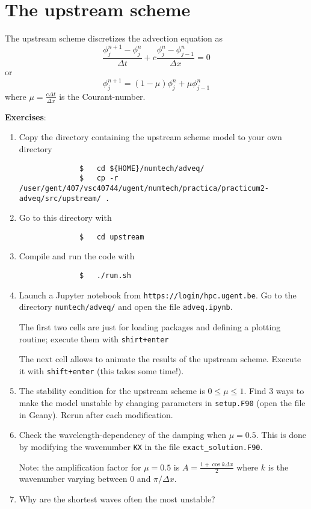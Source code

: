 \documentclass[a4paper]{article}
\begin{document}
\section{The upstream scheme}
%
\par
The upstream scheme discretizes the advection equation as
%
\begin{equation*}
	\frac{\phi^{n+1}_{j}-\phi^{n}_{j}}{\Delta t}+c\frac{\phi^{n}_{j}-\phi^{n}_{j-1}}{\Delta x}=0
\end{equation*}
%
or
%
\begin{equation*}
	\phi^{n+1}_{j}=(1-\mu)\phi^{n}_{j}+\mu\phi^{n}_{j-1}
\end{equation*}
%
where $\mu=\frac{c\Delta t}{\Delta x}$ is the Courant-number.
%
\par\vspace*{3ex}\clearpage
\textbf{Exercises}:
%
\begin{enumerate}
	\item Copy the directory containing the upstream scheme model to your own directory
		\begin{verbatim}
			  $   cd ${HOME}/numtech/adveq/
			  $   cp -r /user/gent/407/vsc40744/ugent/numtech/practica/practicum2-adveq/src/upstream/ .
		\end{verbatim}
	\item Go to this directory with
		\begin{verbatim}
			  $   cd upstream
		\end{verbatim}
	\item Compile and run the code with
		\begin{verbatim}
			  $   ./run.sh
		\end{verbatim}
	\item Launch a Jupyter notebook from \texttt{https://login/hpc.ugent.be}. Go to the directory \texttt{numtech/adveq/} and open the file \texttt{adveq.ipynb}.
		\par
		The first two cells are just for loading packages and defining a plotting routine; execute them with \texttt{shirt+enter}
		\par
		The next cell allows to animate the results of the upstream scheme. Execute it with \texttt{shift+enter} (this takes some time!).
	\item The stability condition for the upstream scheme is $0\leq\mu\leq1$. Find 3 ways to make the model unstable by changing parameters in \verb+setup.F90+ (open the file in Geany). Rerun after each modification.
	\item Check the wavelength-dependency of the damping when $\mu=0.5$. This is done by modifying the wavenumber \verb+KX+ in the file \verb+exact_solution.F90+.
		\par
		Note: the amplification factor for $\mu=0.5$ is $A=\frac{1+\cos k\Delta x}{2}$ where $k$ is the wavenumber varying between 0 and $\pi/\Delta x$.
	\item Why are the shortest waves often the most unstable?
\end{enumerate}
%
\end{document}

